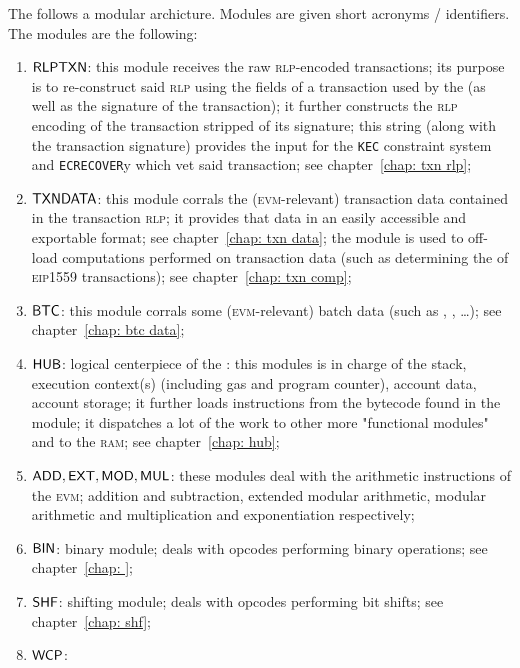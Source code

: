 The \zkEvm{} follows a modular archicture. Modules are given short acronyms / identifiers. The modules are the following:
\begin{enumerate}
	\item $\textsf{RLPTXN}$:
		this module receives the raw \textsc{rlp}-encoded transactions; its purpose is to re-construct said \textsc{rlp} using the fields of a transaction used by the \zkEvm{} (as well as the signature of the transaction); it further constructs the \textsc{rlp} encoding of the transaction stripped of its signature; this string (along with the transaction signature) provides the input for the \texttt{KEC} constraint system and \texttt{ECRECOVER}y which vet said transaction; see chapter~\ref{chap: txn rlp};
	\item $\textsf{TXNDATA}{}$:
		this module corrals the (\textsc{evm}-relevant) transaction data contained in the transaction \textsc{rlp}; it provides that data in an easily accessible and exportable format; see chapter~\ref{chap: txn data};
		\saNote{} the \btcMod{} module is used to off-load computations performed on transaction data (such as determining the  of \textsc{eip1559} transactions); see chapter~\ref{chap: txn comp};
	\item $\textsf{BTC}{}$:
		this module corrals some (\textsc{evm}-relevant) batch data (such as , , \dots); see chapter~\ref{chap: btc data};
	\item $\textsf{HUB}{}$:
		logical centerpiece of the \zkEvm{}: this modules is in charge of the stack, execution context(s) (including gas and program counter), account data, account storage; it further loads instructions from the bytecode found in the \romMod{} module; it dispatches a lot of the work to other more "functional modules" and to the \textsc{ram}; see chapter~\ref{chap: hub};
	\item $\textsf{ADD}{}, \textsf{EXT}{}, \textsf{MOD}{}, \textsf{MUL}{}$:
		these modules deal with the arithmetic instructions of the \textsc{evm}; addition and subtraction, extended modular arithmetic, modular arithmetic and multiplication and exponentiation respectively;
	\item $\textsf{BIN}{}$:
		binary module; deals with opcodes performing binary operations; see chapter~\ref{chap: };
	\item $\textsf{SHF}{}$:
		shifting module; deals with opcodes performing bit shifts; see chapter~\ref{chap: shf};
	\item $\textsf{WCP}{}$:

\end{enumerate}
